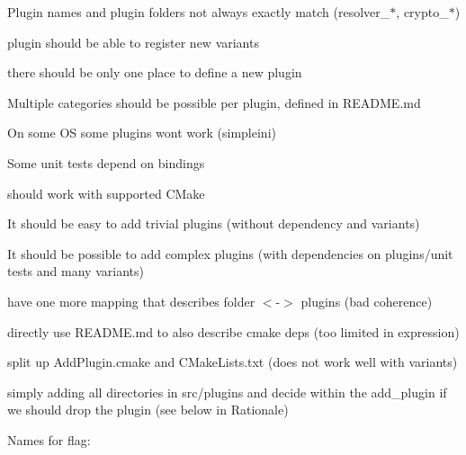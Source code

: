 
\begin{DoxyItemize}
\item Plugin names and plugin folders not always exactly match ({\ttfamily resolver\+\_\+$\ast$}, {\ttfamily crypto\+\_\+$\ast$})
\item plugin should be able to register new variants
\item there should be only one place to define a new plugin
\item Multiple categories should be possible per plugin, defined in R\+E\+A\+D\+M\+E.\+md
\item On some OS some plugins won\textquotesingle{}t work (simpleini)
\item Some unit tests depend on bindings
\end{DoxyItemize}


\begin{DoxyItemize}
\item should work with supported C\+Make
\item It should be easy to add trivial plugins (without dependency and variants)
\item It should be possible to add complex plugins (with dependencies on plugins/unit tests and many variants)
\end{DoxyItemize}


\begin{DoxyItemize}
\item have one more mapping that describes folder $<$-\/$>$ plugins (bad coherence)
\item directly use R\+E\+A\+D\+M\+E.\+md to also describe cmake deps (too limited in expression)
\item split up Add\+Plugin.\+cmake and C\+Make\+Lists.\+txt (does not work well with variants)
\item simply adding all directories in src/plugins and decide within the {\ttfamily add\+\_\+plugin} if we should drop the plugin (see below in Rationale)
\end{DoxyItemize}

Names for flag\+:


